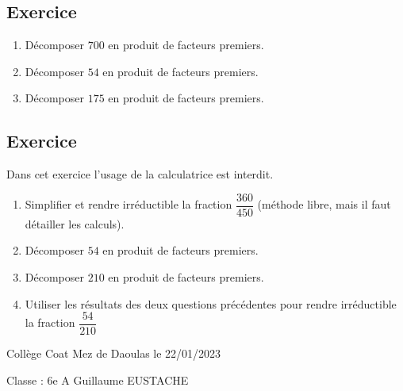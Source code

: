 \documentclass[a4paper,12pt,fleqn]{article}
\newcounter{exo}          				%
\newcommand{\exo}{					%
  	\stepcounter{exo}        			%
  	\subsection*{Exercice \no{}\theexo}}
\newcommand{\titreitem}[1]{
\Ovalbox{\makebox[.99\linewidth][l]{{Compétence : {#1} }}}
\vspace{0.3cm}} %
\begin{document}
\vspace{0.5cm}

\medskip
\begin{minipage}{0.99\linewidth}

\exo

\begin{enumerate}

\item Décomposer $700$ en produit de facteurs premiers.
\item Décomposer $54$ en produit de facteurs premiers.
\item Décomposer $175$ en produit de facteurs premiers.

\end{enumerate}
\end{minipage}

\vspace{0.5cm}

\medskip
\begin{minipage}{0.99\linewidth}

\exo

Dans cet exercice l'usage de la calculatrice est interdit.

\begin{enumerate}

\item Simplifier et rendre irréductible la fraction $\dfrac{360}{450}$ (méthode libre, mais il faut détailler les calculs).
\item Décomposer $54$ en produit de facteurs premiers.
\item Décomposer $210$ en produit de facteurs premiers.
\item Utiliser les résultats des deux questions précédentes pour rendre irréductible la fraction $\dfrac{54}{210}$
\end{enumerate}
\end{minipage}

\vspace{0.5cm}

\medskip
\newpage
\setcounter{exo}{0}


Collège Coat Mez de Daoulas  \hfill  le 22/01/2023

Classe : 6e A \hfill Guillaume EUSTACHE
\end{document}
